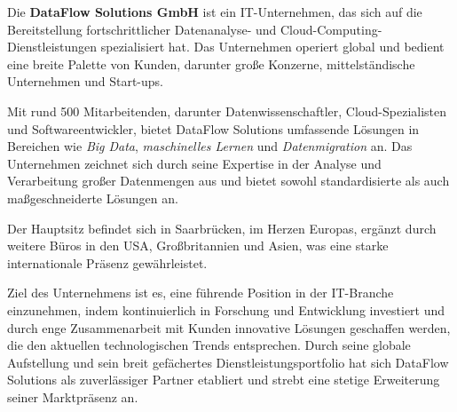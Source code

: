 Die \textbf{DataFlow Solutions GmbH} ist ein IT-Unternehmen, das sich auf die Bereitstellung fortschrittlicher Datenanalyse- und Cloud-Computing-Dienstleistungen spezialisiert hat. Das Unternehmen operiert global und bedient eine breite Palette von Kunden, darunter große Konzerne, mittelständische Unternehmen und Start-ups.

Mit rund 500 Mitarbeitenden, darunter Datenwissenschaftler, Cloud-Spezialisten und Softwareentwickler, bietet DataFlow Solutions umfassende Lösungen in Bereichen wie \textit{Big Data}, \textit{maschinelles Lernen} und \textit{Datenmigration} an. Das Unternehmen zeichnet sich durch seine Expertise in der Analyse und Verarbeitung großer Datenmengen aus und bietet sowohl standardisierte als auch maßgeschneiderte Lösungen an.

Der Hauptsitz befindet sich in Saarbrücken, im Herzen Europas, ergänzt durch weitere Büros in den USA, Großbritannien und Asien, was eine starke internationale Präsenz gewährleistet.

Ziel des Unternehmens ist es, eine führende Position in der IT-Branche einzunehmen, indem kontinuierlich in Forschung und Entwicklung investiert und durch enge Zusammenarbeit mit Kunden innovative Lösungen geschaffen werden, die den aktuellen technologischen Trends entsprechen. Durch seine globale Aufstellung und sein breit gefächertes Dienstleistungsportfolio hat sich DataFlow Solutions als zuverlässiger Partner etabliert und strebt eine stetige Erweiterung seiner Marktpräsenz an.
